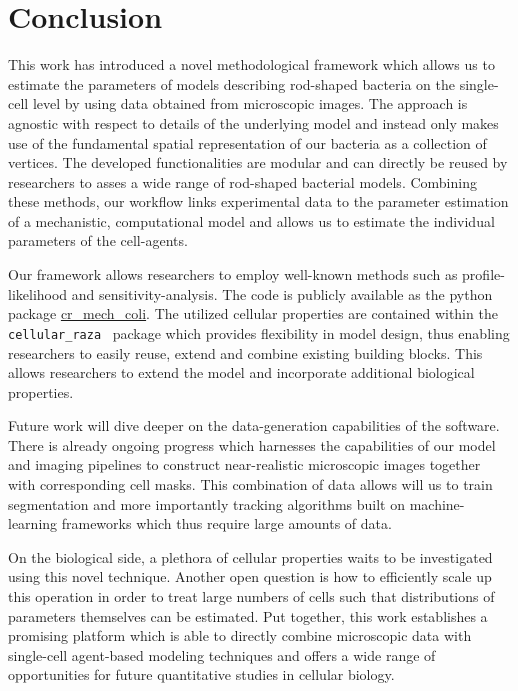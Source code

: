 \documentclass[10pt,letterpaper]{article}
\begin{document}
\section{Conclusion}

This work has introduced a novel methodological framework which allows us to estimate the parameters
of models describing rod-shaped bacteria on the single-cell level by using data obtained from
microscopic images. The approach is agnostic with respect to details of the underlying model and
instead only makes use
of the fundamental spatial representation of our bacteria as a collection of vertices.
The developed functionalities are modular and can directly be reused by researchers to asses a wide
range of rod-shaped bacterial models. Combining these methods, our workflow links experimental data
to the parameter estimation of a mechanistic, computational model and allows us to estimate the 
individual parameters of the cell-agents.

Our framework allows researchers to employ well-known methods such as profile-likelihood and
sensitivity-analysis.
The code is publicly available as the python package
\href{https://github.com/jonaspleyer/cr_mech_coli}{cr\_mech\_coli}.
The utilized cellular properties are contained within the \texttt{cellular\_raza}~\cite{Pleyer2025}
package which provides flexibility in model design, thus enabling researchers to easily reuse,
extend and combine existing building blocks.
This allows researchers to extend the model and incorporate additional biological properties.

Future work will dive deeper on the data-generation capabilities of the software.
There is already ongoing progress which harnesses the capabilities of our model and imaging pipelines
to construct near-realistic microscopic images together with corresponding cell masks.
This combination of data allows will us to train segmentation and more importantly tracking algorithms
built on machine-learning frameworks which thus require large amounts of data.

On the biological side, a plethora of cellular properties waits to be investigated using this novel
technique.
Another open question is how to efficiently scale up this operation in order to treat large numbers
of cells such that distributions of parameters themselves can be estimated.
Put together, this work establishes a promising platform which is able to directly combine
microscopic data with single-cell agent-based modeling techniques and offers a wide range of
opportunities for future quantitative studies in cellular biology.
\end{document}

